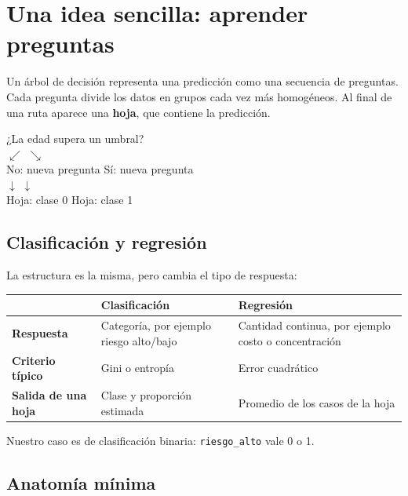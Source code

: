\documentclass[11pt,oneside,openany]{book}
\begin{document}
\chapter{Una idea sencilla: aprender preguntas}

Un árbol de decisión representa una predicción como una secuencia de preguntas.
Cada pregunta divide los datos en grupos cada vez más homogéneos. Al final de
una ruta aparece una \textbf{hoja}, que contiene la predicción.

\begin{center}
\begin{tcolorbox}[width=0.88\textwidth,colback=Nube,colframe=Petroleo!45]
\centering\sffamily
¿La edad supera un umbral?\\[0.3em]
$\swarrow$ \hspace{5cm} $\searrow$\\[-0.2em]
No: nueva pregunta \hspace{2.5cm} Sí: nueva pregunta\\[0.3em]
$\downarrow$ \hspace{5.6cm} $\downarrow$\\[-0.2em]
Hoja: clase 0 \hspace{3.4cm} Hoja: clase 1
\end{tcolorbox}
\end{center}

\section{Clasificación y regresión}

La estructura es la misma, pero cambia el tipo de respuesta:

\begin{tabularx}{\textwidth}{>{\bfseries}lXX}
\toprule
 & Clasificación & Regresión \\
\midrule
Respuesta & Categoría, por ejemplo riesgo alto/bajo & Cantidad continua, por ejemplo costo o concentración \\
Criterio típico & Gini o entropía & Error cuadrático \\
Salida de una hoja & Clase y proporción estimada & Promedio de los casos de la hoja \\
\bottomrule
\end{tabularx}

Nuestro caso es de clasificación binaria: \texttt{riesgo\_alto} vale 0 o 1.

\section{Anatomía mínima}
\end{document}
